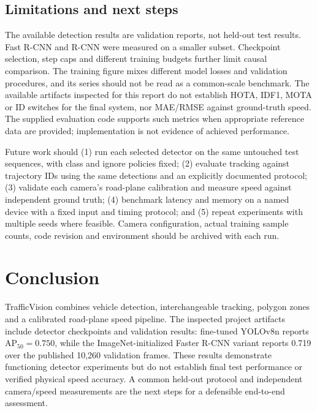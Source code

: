 \subsection{Limitations and next steps}
\label{sec:limitations}
The available detection results are validation reports, not held-out test results. Fast R-CNN and R-CNN were measured on a smaller subset. Checkpoint selection, step caps and different training budgets further limit causal comparison. The training figure mixes different model losses and validation procedures, and its series should not be read as a common-scale benchmark. The available artifacts inspected for this report do not establish HOTA, IDF1, MOTA or ID switches for the final system, nor MAE/RMSE against ground-truth speed. The supplied evaluation code supports such metrics when appropriate reference data are provided; implementation is not evidence of achieved performance.

Future work should (1) run each selected detector on the same untouched test sequences, with class and ignore policies fixed; (2) evaluate tracking against trajectory IDs using the same detections and an explicitly documented protocol; (3) validate each camera's road-plane calibration and measure speed against independent ground truth; (4) benchmark latency and memory on a named device with a fixed input and timing protocol; and (5) repeat experiments with multiple seeds where feasible. Camera configuration, actual training sample counts, code revision and environment should be archived with each run.

\section{Conclusion}
TrafficVision combines vehicle detection, interchangeable tracking, polygon zones and a calibrated road-plane speed pipeline. The inspected project artifacts include detector checkpoints and validation results: fine-tuned YOLOv8n reports AP$_{50}=0.750$, while the ImageNet-initialized Faster R-CNN variant reports 0.719 over the published 10,260 validation frames. These results demonstrate functioning detector experiments but do not establish final test performance or verified physical speed accuracy. A common held-out protocol and independent camera/speed measurements are the next steps for a defensible end-to-end assessment.

